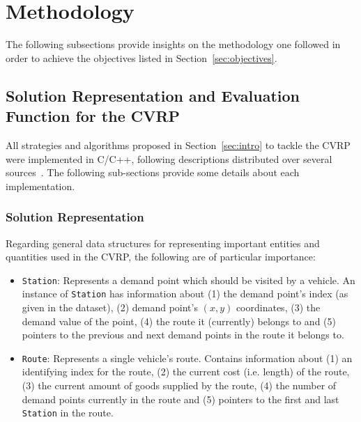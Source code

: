 \section{Methodology}
\label{sec:method}

The following subsections provide insights on the methodology one followed 
in order to achieve the objectives listed in Section~\ref{sec:objectives}.

\subsection{Solution Representation and Evaluation Function for the CVRP}
\label{subsec:spec-enti}

All strategies and algorithms proposed in Section~\ref{sec:intro} to tackle 
the CVRP were implemented in C\slash C++, following descriptions distributed 
over several sources~\cite{Toth2002, Michalewicz2004, Thangiahl1996, 
Psaraftis1983391, Osman1993}. 
The following sub-sections provide some details about each 
implementation.\vertbreak

\subsubsection{Solution Representation}
\label{subsubsec:sol-rep}

Regarding general data structures for representing important entities and 
quantities used in the CVRP, the following are of particular importance:

\begin{itemize}

    \item \verb?Station?: Represents a demand point which should be visited by 
            a vehicle. An instance of \verb?Station? has information about (1) the 
            demand point's index (as given in the dataset), (2) demand point's 
            $(x,y)$ coordinates, (3) the demand value of the point, (4) the 
            route it (currently) belongs to and (5) pointers to the previous and 
            next demand points in the route it belongs to.
    \item \verb?Route?: Represents a single vehicle's route. Contains 
            information about (1) an identifying index for the route, (2) the 
            current cost (i.e. length) of the route, (3) the 
            current amount of goods supplied 
            by the route, (4) the number of demand points currently in the 
            route and (5) pointers to the first and last \verb?Station? in the 
            route.
\end{itemize}\vertbreak

